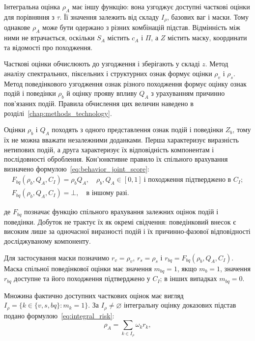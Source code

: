 Інтегральна оцінка $\rho_A$ має іншу функцію: вона узгоджує доступні часткові оцінки для порівняння з $\tau$. Її значення залежить від складу $I_{\rho}$, базових ваг і маски. Тому однакове $\rho_A$ може бути одержано з різних комбінацій підстав. Відмінність між ними не втрачається, оскільки $S_A$ містить $c_A$ і $\Pi$, а $Z$ містить маску, координати та відомості про походження.

Часткові оцінки обчислюють до узгодження і зберігають у складі $z$. Метод аналізу спектральних, піксельних і структурних ознак формує оцінки $\rho_v$ і $\rho_s$. Метод поведінкового узгодження ознак різного походження формує оцінку ознак подій і поведінки $\rho_b$ й оцінку прояву впливу $Q_A$ з урахуванням причинно пов’язаних подій. Правила обчислення цих величин наведено в розділі~\ref{chap:methods_technology}.

Оцінки $\rho_b$ і $Q_A$ походять з одного представлення ознак подій і поведінки $Z_b$, тому їх не можна вважати незалежними доданками. Перша характеризує виразність нетипових подій, а друга характеризує їх відповідність компонентам і послідовності оброблення. Кон’юнктивне правило їх спільного врахування визначено формулою~\eqref{eq:behavior_joint_score}:
\begin{equation}
\begin{gathered}
F_{bq}(\rho_b,Q_A,C_I)=\rho_bQ_A,
\quad \rho_b,Q_A\in[0,1]\ \text{і походження підтверджено в }C_I;\\
F_{bq}(\rho_b,Q_A,C_I)=\bot,
\quad \text{в іншому разі}.
\end{gathered}
\label{eq:behavior_joint_score}
\end{equation}

де $F_{bq}$ позначає функцію спільного врахування залежних оцінок подій і поведінки. Добуток не трактує їх як окремі свідчення: поведінковий внесок є високим лише за одночасної виразності подій і їх причинно-фазової відповідності досліджуваному компоненту.

Для застосування маски позначимо $r_v=\rho_v$, $r_s=\rho_s$ і $r_{bq}=F_{bq}(\rho_b,Q_A,C_I)$. Маска спільної поведінкової оцінки має значення $m_{bq}=1$, якщо $m_b=1$, значення $r_{bq}$ доступне та його походження підтверджено у $C_I$; в інших випадках $m_{bq}=0$.

Множина фактично доступних часткових оцінок має вигляд $I_{\rho}=\{k\in\{v,s,bq\}:m_k=1\}$. За $I_{\rho}\neq\varnothing$ інтегральну оцінку доказових підстав подано формулою~\eqref{eq:integral_risk}:
\begin{equation}
\rho_A=\sum_{k\in I_{\rho}}\omega_k r_k,
\label{eq:integral_risk}
\end{equation}

